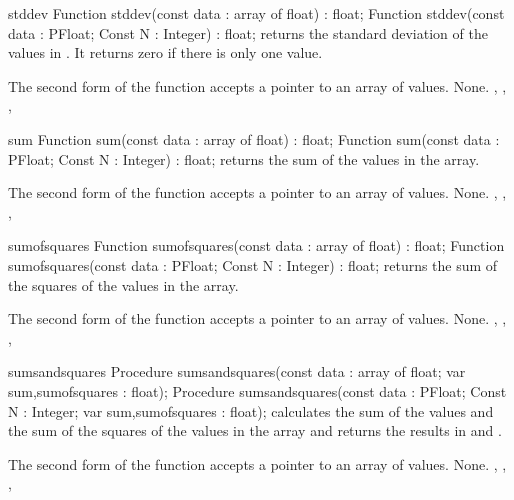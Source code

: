

\begin{function}{stddev}
\Declaration
Function stddev(const data : array of float) : float;
Function stddev(const data : PFloat; Const N : Integer) : float;
\Description
{} returns the standard deviation of the values in .
It returns zero if there is only one value.

The second form of the function accepts a pointer to an array of 
values.
\Errors
None.
\SeeAlso
{}, , , 
\end{function}



\begin{function}{sum}
\Declaration
Function sum(const data : array of float) : float;
Function sum(const data : PFloat; Const N : Integer) : float;
\Description
{} returns the sum of the values in the  array.

The second form of the function accepts a pointer to an array of 
values.
\Errors
None.
\SeeAlso
{}, , 
, 
\end{function}



\begin{function}{sumofsquares}
\Declaration
Function sumofsquares(const data : array of float) : float;
Function sumofsquares(const data : PFloat; Const N : Integer) : float;
\Description
{} returns the sum of the squares of the values in the  
array.

The second form of the function accepts a pointer to an array of 
values.
\Errors
None.
\SeeAlso
{}, , 
, 
\end{function}



\begin{procedure}{sumsandsquares}
\Declaration
Procedure sumsandsquares(const data : array of float;
  var sum,sumofsquares : float);
Procedure sumsandsquares(const data : PFloat; Const N : Integer;
  var sum,sumofsquares : float);
\Description
{} calculates the sum of the values and the sum of 
the squares of the values in the  array and returns the
results in  and .

The second form of the function accepts a pointer to an array of 
values.
\Errors
None.
\SeeAlso
{}, , 
, 
\end{procedure}

